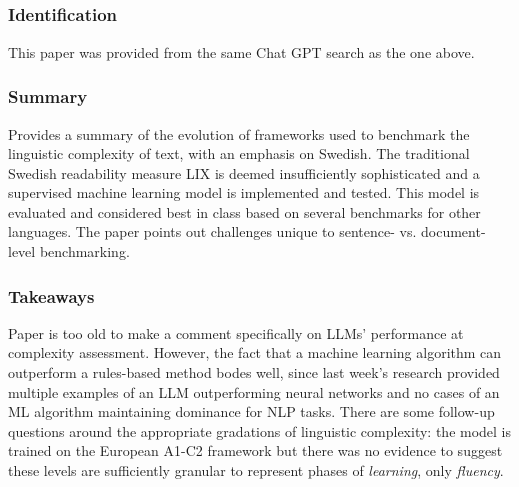 \documentclass[
	letterpaper, %
]{jdf}
\begin{document}
\subsection{}
\subsubsection{Identification}
This paper was provided from the same Chat GPT search as the one above.

\subsubsection{Summary}
Provides a summary of the evolution of frameworks used to benchmark the linguistic complexity of text, with an emphasis on Swedish. The traditional Swedish readability measure LIX is deemed insufficiently sophisticated and a supervised machine learning model is implemented and tested. This model is evaluated and considered best in class based on several benchmarks for other languages. The paper points out challenges unique to sentence- vs. document-level benchmarking.

\subsubsection{Takeaways}
Paper is too old to make a comment specifically on LLMs' performance at complexity assessment. However, the fact that a machine learning algorithm can outperform a rules-based method bodes well, since last week's research provided multiple examples of an LLM outperforming neural networks and no cases of an ML algorithm maintaining dominance for NLP tasks. There are some follow-up questions around the appropriate gradations of linguistic complexity: the model is trained on the European A1-C2 framework but there was no evidence to suggest these levels are sufficiently granular to represent phases of \textit{learning}, only \textit{fluency}.

\subsection{}
\end{document}
